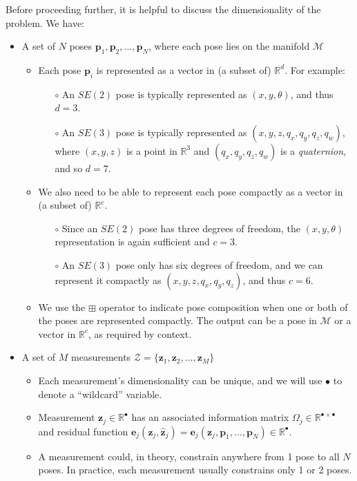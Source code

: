\documentclass{article}
\def\keyterm{\textit}
\begin{document}
Before proceeding further, it is helpful to discuss the dimensionality of the problem.  We have:
\begin{itemize}
  \item A set of $N$ poses $\mathbf{p}_1, \mathbf{p}_2, \ldots, \mathbf{p}_N$, where each pose lies on the manifold $\mathcal{M}$
  \begin{itemize}
    \item Each pose $\mathbf{p}_i$ is represented as a vector in (a subset of) $\mathbb{R}^d$.  For example:
    \begin{itemize}
      \item[$\circ$] An $SE(2)$ pose is typically represented as $(x, y, \theta)$, and thus $d = 3$.
      \item[$\circ$] An $SE(3)$ pose is typically represented as $(x, y, z, q_x, q_y, q_z, q_w)$, where $(x, y, z)$ is a point in $\mathbb{R}^3$ and $(q_x, q_y, q_z, q_w)$ is a \keyterm{quaternion}, and so $d = 7$.
    \end{itemize}
    \item We also need to be able to represent each pose compactly as a vector in (a subset of) $\mathbb{R}^c$.
    \begin{itemize}
      \item[$\circ$] Since an $SE(2)$ pose has three degrees of freedom, the $(x, y, \theta)$ representation is again sufficient and $c=3$.  
      \item[$\circ$] An $SE(3)$ pose only has six degrees of freedom, and we can represent it compactly as $(x, y, z, q_x, q_y, q_z)$, and thus $c=6$.
    \end{itemize}
    \item We use the $\boxplus$ operator to indicate pose composition when one or both of the poses are represented compactly.  The output can be a pose in $\mathcal{M}$ or a vector in $\mathbb{R}^c$, as required by context.
  \end{itemize}
  \item A set of $M$ measurements $\mathcal{Z} = \{\mathbf{z}_1, \mathbf{z}_2, \ldots, \mathbf{z}_M\}$
  \begin{itemize}
    \item Each measurement's dimensionality can be unique, and we will use $\bullet$ to denote a ``wildcard'' variable.
    \item Measurement $\mathbf{z}_j \in \mathbb{R}^\bullet$ has an associated information matrix $\Omega_j \in \mathbb{R}^{\bullet \times \bullet}$ and residual function $\mathbf{e}_j(\mathbf{z}_j, \hat{\mathbf{z}}_j) = \mathbf{e}_j(\mathbf{z}_j, \mathbf{p}_1, \ldots, \mathbf{p}_N) \in \mathbb{R}^\bullet$.
    \item A measurement could, in theory, constrain anywhere from 1 pose to all $N$ poses.  In practice, each measurement usually constrains only 1 or 2 poses.  
  \end{itemize}
\end{itemize}
\end{document}
